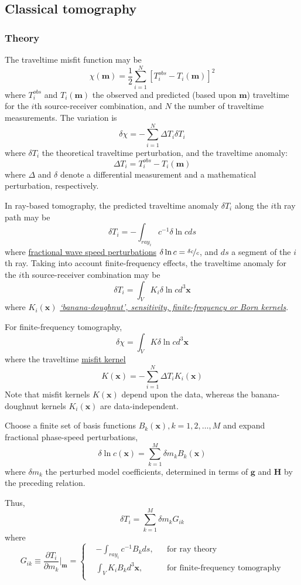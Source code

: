 \documentclass{article}
\newcommand{\mbf}[1]{\mathbf{#1}}
\newcommand{\myem}[1]{{\color{red}\uline{#1}}}
\newcommand{\mynem}[1]{\textsl{\uline{#1}}}
\begin{document}
\subsection{Classical tomography}
\subsubsection{Theory}
The traveltime misfit function may be
\[ \chi(\mbf m)=\frac{1}{2}\sum_{i=1}^N[T_i^{obs}-T_i(\mbf m)]^2 \]
where $T_i^{obs}$ and $T_i(\mbf m)$ the observed and predicted (based upon $\mbf m$) traveltime for the $i$th source-receiver combination, and $N$ the number of traveltime measurements. The variation is
\[ \delta\chi=-\sum_{i=1}^N\Delta T_i\delta T_i \]
where $\delta T_i$ the theoretical traveltime perturbation, and the traveltime anomaly:
\[ \Delta T_i=T_i^{obs}-T_i(\mbf m) \]
where $\Delta$ and $\delta$ denote a differential measurement and a mathematical perturbation, respectively.\par
In ray-based tomography, the predicted traveltime anomaly $\delta T_i$ along the $i$th ray path may be
\[ \delta T_i=-\int_{ray_i}c^{-1}\delta\ln cds \]
where \myem{fractional wave speed perturbations} $\delta\ln c=\nicefrac{\delta c}{c}$, and $ds$ a segment of the $i$th ray. Taking into account finite-frequency effects, the traveltime anomaly for the $i$th source-receiver combination may be
\[ \delta T_i=\int_VK_i\delta\ln cd^3\mbf x \]
where $K_i(\mbf x)$ \mynem{`banana-doughnut', sensitivity, finite-frequency or Born kernels}.\par
For finite-frequency tomography,
\[ \delta\chi=\int_VK\delta\ln cd^3\mbf x \]
where the traveltime \myem{misfit kernel}
\[ K(\mbf x)=-\sum_{i=1}^N\Delta T_iK_i(\mbf x) \]
Note that misfit kernels $K(\mbf x)$ depend upon the data, whereas the banana-doughnut kernels $K_i(\mbf x)$ are data-independent.\par
Choose a finite set of basis functions $B_k(\mbf x),k=1,2,\ldots,M$ and expand fractional phase-speed perturbations,
\[ \delta\ln c(\mbf x)=\sum_{k=1}^M\delta m_kB_k(\mbf x) \]
where $\delta m_k$ the perturbed model coefficients, determined in terms of $\mbf g$ and $\mbf H$ by the preceding relation.\par
Thus,
\[ \delta T_i=\sum_{k=1}^M\delta m_kG_{ik} \]
where
\begin{equation*}
  G_{ik}\equiv\frac{\partial T_i}{\partial m_k}\Big|_{\mbf m}=\left\{
  \begin{aligned}
    & -\int_{ray_i}c^{-1}B_kds, & & \text{for ray theory} \\
    & \int_VK_iB_kd^3\mbf x, & & \text{for finite-frequency tomography} \\
  \end{aligned} \right.
\end{equation*}\par
\end{document}
